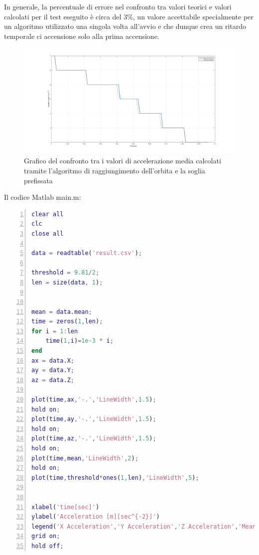 \documentclass[LaM,binding=0.6cm,oneside]{../sapthesis}
\begin{document}
\begin{itemize}
    In generale, la percentuale di errore nel confronto tra valori teorici e valori calcolati per il test eseguito è circa del 3\%, un valore accettabile specialmente per un algoritmo utilizzato una singola volta all'avvio e che dunque crea un ritardo temporale ci accensione solo alla prima accensione.
    
    \begin{figure}[htbp]
    \centerline{\includegraphics[scale=0.4]{examples/CompareAlgorithResult.png}}
    \caption{Grafico del confronto tra i valori di accelerazione media calcolati tramite l'algoritmo di raggiungimento dell'orbita e la soglia prefissata}
    \label{fig}
    \end{figure}
\end{itemize}


\newpage
Il codice Matlab main.m:
\newline
\begin{lstlisting}[language=Matlab,
                   basicstyle=\scriptsize,
                   numbers=left,
                   stepnumber=0,
                   numbersep=4pt,
                   tabsize=2,
                   showspaces=false,
                   showstringspaces=false]
clear all
clc
close all

data = readtable('result.csv');

threshold = 9.81/2;
len = size(data, 1);


mean = data.mean;
time = zeros(1,len);
for i = 1:len
    time(1,i)=1e-3 * i;
end
ax = data.X;
ay = data.Y;
az = data.Z;

plot(time,ax,'-.','LineWidth',1.5);
hold on;
plot(time,ay,'-.','LineWidth',1.5);
hold on;
plot(time,az,'-.','LineWidth',1.5);
hold on;
plot(time,mean,'LineWidth',2);
hold on;
plot(time,threshold*ones(1,len),'LineWidth',5);


xlabel('time[sec]')
ylabel('Acceleration [m][sec^{-2}]')
legend('X Acceleration','Y Acceleration','Z Acceleration','Mean Acceleration','Acceleration Threshold')
grid on;
hold off;
\end{lstlisting}
\newpage
\end{document}
